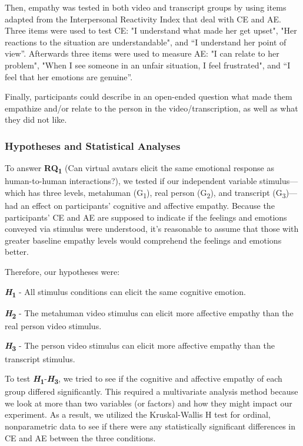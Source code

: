 Then, empathy was tested in both video and transcript groups by using items adapted from the Interpersonal Reactivity Index \cite{DAV83} that deal with CE and AE. Three items were used to test CE: "I understand what made her get upset", "Her reactions to the situation are understandable", and “I understand her point of view”. Afterwards three items were used to measure AE: "I can relate to her problem", "When I see someone in an unfair situation, I feel frustrated", and “I feel that her emotions are genuine”.

Finally, participants could describe in an open-ended question what made them empathize and/or relate to the person in the video/transcription, as well as what they did not like.

\subsubsection{Hypotheses and Statistical Analyses}
To answer \textbf{RQ\textsubscript{1}} (Can virtual avatars elicit the same emotional response as human-to-human interactions?), we tested if our independent variable stimulus---which has three levels, metahuman (G\textsubscript{1}), real person (G\textsubscript{2}), and transcript (G\textsubscript{3})---had an effect on participants' cognitive and affective empathy. Because the participants' CE and AE are supposed to indicate if the feelings and emotions conveyed via stimulus were understood, it's reasonable to assume that those with greater baseline empathy levels would comprehend the feelings and emotions better.

Therefore, our hypotheses were:

\textbf{\textit{H}\textsubscript{1}} - All stimulus conditions can elicit the same cognitive emotion.

\textbf{\textit{H}\textsubscript{2}} - The metahuman video stimulus can elicit more affective empathy than the real person video stimulus.

\textbf{\textit{H}\textsubscript{3}} - The person video stimulus can elicit more affective empathy than the transcript stimulus.

To test \textbf{\textit{H}\textsubscript{1}}-\textbf{\textit{H}\textsubscript{3}}, we tried to see if the cognitive and affective empathy of each group differed significantly. This required a multivariate analysis method because we look at more than two variables (or factors) and how they might impact our experiment. As a result, we utilized the Kruskal-Wallis H test for ordinal, nonparametric data to see if there were any statistically significant differences in CE and AE between the three conditions.

